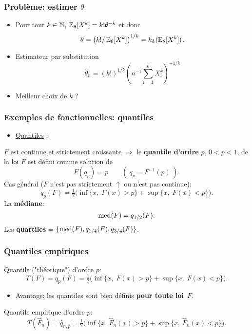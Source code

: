 \begin{frame}
\frametitle{Problème: estimer $\theta$}
\begin{itemize}
\item Pour tout $k \in \mathbb{N}$, $\operatorname{{\mathbb E}}_\theta[X^k]= k ! \theta^{-k}$ et donc
$$
\theta = \left( k! /\operatorname{{\mathbb E}}_{\theta}[X^k] \right)^{1/k}  = h_k( \operatorname{{\mathbb E}}_\theta[X^k] ) \,.
$$
\item \alert{Estimateur par substitution}
$$
\hat{\theta}_n = (k! )^{1/k} \left(n^{-1} \sum_{i=1}^n X_i^k \right)^{-1/k}
$$
\item \alert{Meilleur choix de $k$ ?}
\end{itemize}
\end{frame}


\begin{frame}
\frametitle{Exemples de fonctionnelles: quantiles}
\begin{itemize}
\item \underline{Quantiles} :
\end{itemize}
$F$ est \alert{continue et strictement croissante}
$\Longrightarrow$ le {\bf quantile d'ordre} $p$, $0 < p < 1$, de la
loi $F$ est d\'efini comme solution de
$$
F(q_p) = p \quad \quad ( \ q_p=F^{-1}(p) \ ).
$$
\alert{Cas g\'en\'eral} ($F$ n'est pas strictement $\uparrow$
ou n'est pas continue):
$$
q_p(F) = \tfrac{1}{2}\big(\inf\{x,\;F(x)>p\}+\sup\{x,\;F(x) <
p\}\big).
$$
La {\bf médiane}:
$${\rm med}(F)=q_{1/2}(F).$$
Les {\bf quartiles} = $\{{\rm med}(F), q_{1/4}(F), q_{3/4}(F)\}$.
\end{frame}


\begin{frame}
\frametitle{Quantiles empiriques}

Quantile ("th\'eorique") d'ordre $p$:
$$
T(F)=q_p(F) = \tfrac{1}{2}\big(\inf\{x,\;F(x)>p\}+\sup\{x,\;F(x) <
p\}\big).
$$
\begin{itemize}\item Avantage: les quantiles sont bien d\'efinis {\bf pour toute
loi}~$F$.
\end{itemize}

\vspace{3mm}

Quantile empirique d'ordre $p$:
$$T(\widehat F_n) = \widehat q_{n,p} =
\tfrac{1}{2}\big(\inf\{x,\,\widehat F_n(x)>p\}+\sup\{x,\,\widehat
F_n(x)<p\}\big).
$$
\end{frame}


